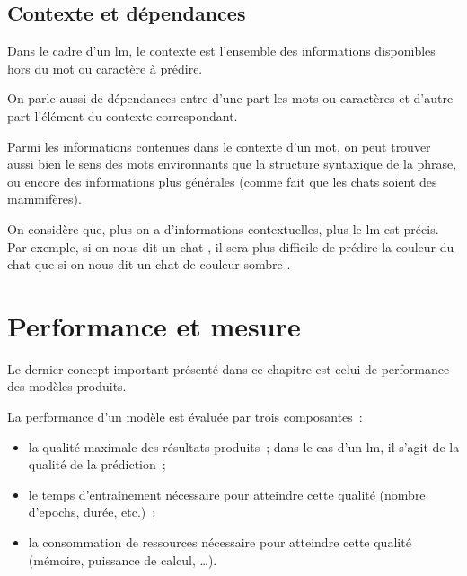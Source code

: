\subsection{Contexte et dépendances} \label{def:context} \label{def:dependency}
Dans le cadre d'un \gls{lm}, le contexte est l'ensemble des informations disponibles hors du mot ou caractère à prédire.

On parle aussi de dépendances entre d'une part les mots ou caractères et d'autre part l'élément du contexte correspondant.

Parmi les informations contenues dans le contexte d'un mot, on peut trouver aussi bien le sens des mots environnants que la structure syntaxique de la phrase, ou encore des informations plus générales (comme fait que les chats soient des mammifères).


On considère que, plus on a d'informations contextuelles, plus le \gls{lm} est précis. Par exemple, si on nous dit \og un chat \fg{}, il sera plus difficile de prédire la couleur du chat que si on nous dit \og un chat de couleur sombre \fg{}.

\section{Performance et mesure} \label{def:bpc}
Le dernier concept important présenté dans ce chapitre est celui de performance des modèles produits.

La performance d'un modèle est évaluée par trois composantes~:
\begin{itemize}
	\item la qualité maximale des résultats produits~; dans le cas d'un \gls{lm}, il s'agit de la qualité de la prédiction~;
	\item le temps d'entraînement nécessaire pour atteindre cette qualité (nombre d'\glspl{epoch}, durée, etc.)~;
	\item la consommation de ressources nécessaire pour atteindre cette qualité (mémoire, puissance de calcul, \dots).
\end{itemize}
\vspace{1em}


